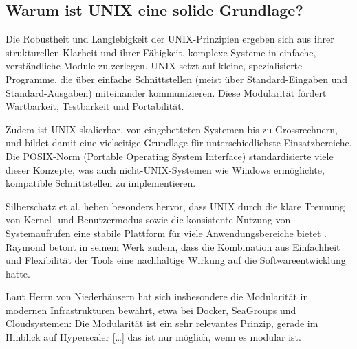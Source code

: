 \subsection{Warum ist UNIX eine solide Grundlage?}

Die Robustheit und Langlebigkeit der UNIX-Prinzipien ergeben sich aus ihrer strukturellen Klarheit und ihrer Fähigkeit, komplexe Systeme in einfache,
verständliche Module zu zerlegen. UNIX setzt auf kleine, spezialisierte Programme, die über einfache Schnittstellen (meist über Standard-Eingaben und
Standard-Ausgaben) miteinander kommunizieren. Diese Modularität fördert Wartbarkeit, Testbarkeit und Portabilität. \cite{ArtOfUnixProgramming, ModernOS}

Zudem ist UNIX skalierbar, von eingebetteten Systemen bis zu Grossrechnern, und bildet damit eine vielseitige Grundlage für unterschiedlichste Einsatzbereiche.
Die POSIX-Norm (Portable Operating System Interface) standardisierte viele dieser Konzepte, was auch nicht-UNIX-Systemen wie Windows ermöglichte, kompatible
Schnittstellen zu implementieren. \cite{OSConcept}

Silberschatz et al. heben besonders hervor, dass UNIX durch die klare Trennung von Kernel- und Benutzermodus sowie die konsistente Nutzung von Systemaufrufen eine
stabile Plattform für viele Anwendungsbereiche bietet \cite{OSConcept}. Raymond betont in seinem Werk zudem, dass die Kombination aus Einfachheit und Flexibilität
der Tools eine nachhaltige Wirkung auf die Softwareentwicklung hatte. \cite{ArtOfUnixProgramming}

Laut Herrn von Niederhäusern hat sich insbesondere die Modularität in modernen Infrastrukturen bewährt, etwa bei Docker, SeaGroups und Cloudsystemen:
\glqq Die Modularität ist ein sehr relevantes Prinzip, gerade im Hinblick auf Hyperscaler [\ldots] das ist nur möglich, wenn es modular ist.\grqq
\ \cite{interviewNH}